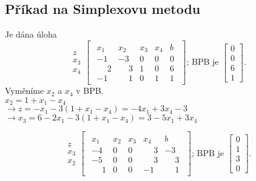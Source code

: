 \subsection{Příkad na Simplexovu metodu}
Je dána úloha
\begin{equation*}
    \begin{array}{c}
        \\
        z \\
        x_3 \\
        x_4 \\
    \end{array}
    \begin{bmatrix}
        \begin{array}{cccc|c}
            x_1 & x_2 & x_3 & x_4 & b \\ \hline
            -1 & -3 & 0 & 0 & 0 \\ \hline
            \phantom{-}2 & \phantom{-}3 & 1 & 0 & 6  \\
            -1 & \phantom{-}1 & 0 & 1 & 1
        \end{array}
    \end{bmatrix}
    \text{; BPB je }
    \begin{bmatrix}
        0 \\
        0 \\
        6 \\
        1
    \end{bmatrix}.
\end{equation*}
Vyměníme $x_2$ a $x_4$ v BPB.\\
$x_2 = 1 + x_1 - x_4$\\
$\rightarrow z = -x_1 - 3(1+x_1-x_4) = -4x_1 + 3x_4 - 3$\\
$\rightarrow x_3 = 6 - 2x_1 - 3(1+x_1-x_4) = 3-5x_1+3x_4$


\begin{equation*}
    \begin{array}{c}
        \\
        z \\
        x_3 \\
        x_2 \\
    \end{array}
    \begin{bmatrix}
        \begin{array}{cccc|c}
            x_1 & x_2 & x_3 & x_4 & b \\ \hline
            -4 & 0 & 0 & \phantom{-}3 & -3 \\ \hline
            -5 & 0 & 0 & \phantom{-}3 & \phantom{-}3  \\
            \phantom{-}1 & 0 & 0 & -1 & \phantom{-}1
        \end{array}
    \end{bmatrix}
    \text{; BPB je }
    \begin{bmatrix}
        0 \\
        1 \\
        3 \\
        0
    \end{bmatrix}.
\end{equation*}